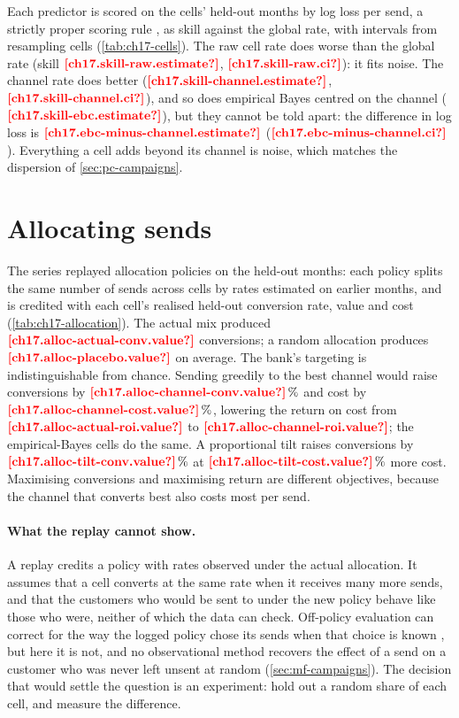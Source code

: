 Each predictor is scored on the cells' held-out months by log loss per send, a strictly proper scoring rule
\autocite{gneiting2007}, as skill against the global rate, with intervals from resampling cells (\cref{tab:ch17-cells}). The
raw cell rate does worse than the global rate (skill $\est{ch17.skill-raw}{estimate}$, $\est{ch17.skill-raw}{ci}$): it fits
noise. The channel rate does better ($\est{ch17.skill-channel}{estimate}$, $\est{ch17.skill-channel}{ci}$), and so does empirical
Bayes centred on the channel ($\est{ch17.skill-ebc}{estimate}$), but they cannot be told apart: the difference in log loss is
$\est{ch17.ebc-minus-channel}{estimate}$ ($\est{ch17.ebc-minus-channel}{ci}$). Everything a cell adds beyond its channel is
noise, which matches the dispersion of \cref{sec:pc-campaigns}.



\section{Allocating sends}\label{sec:pc-allocation}

The series replayed allocation policies on the held-out months: each policy splits the same number of sends across cells
by rates estimated on earlier months, and is credited with each cell's realised held-out conversion rate, value and cost
(\cref{tab:ch17-allocation}). The actual mix produced $\est{ch17.alloc-actual-conv}{value}$ conversions; a random allocation
produces $\est{ch17.alloc-placebo}{value}$ on average. The bank's targeting is indistinguishable from chance. Sending greedily to
the best channel would raise conversions by $\est{ch17.alloc-channel-conv}{value}\,\%$ and cost by
$\est{ch17.alloc-channel-cost}{value}\,\%$, lowering the return on cost from $\est{ch17.alloc-actual-roi}{value}$ to
$\est{ch17.alloc-channel-roi}{value}$; the empirical-Bayes cells do the same. A proportional tilt raises conversions by
$\est{ch17.alloc-tilt-conv}{value}\,\%$ at $\est{ch17.alloc-tilt-cost}{value}\,\%$ more cost. Maximising conversions and
maximising return are different objectives, because the channel that converts best also costs most per send.



\paragraph{What the replay cannot show.} A replay credits a policy with rates observed under the actual allocation. It assumes
that a cell converts at the same rate when it receives many more sends, and that the customers who would be sent to under the
new policy behave like those who were, neither of which the data can check. Off-policy evaluation can correct for the way the
logged policy chose its sends when that choice is known \autocite{dudik2011}, but here it is not, and no observational method
recovers the effect of a send on a customer who was never left unsent at random (\cref{sec:mf-campaigns}). The decision that
would settle the question is an experiment: hold out a random share of each cell, and measure the difference.

